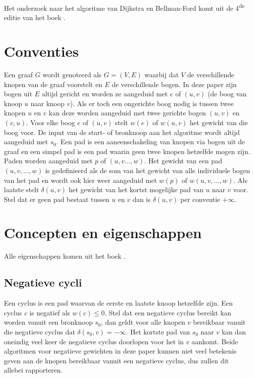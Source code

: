 \documentclass[conference]{IEEEtran}
\theoremstyle{definition}
\DeclarePairedDelimiter{\card}{\vert}{\vert}  %
\begin{document}
Het onderzoek naar het algoritme van Dijkstra en Bellman-Ford komt uit de 4\textsuperscript{de} editie van het boek  \cite{Introduction}.

\section{Conventies}
Een graaf $G$ wordt genoteerd als $G = (V, E)$ waarbij dat $V$ de verschillende knopen van de graaf voorstelt en $E$ de verschillende bogen. In deze paper zijn bogen uit $E$ altijd gericht en worden ze aangeduid met $e$ of $(u, v)$ (de boog van knoop $u$ naar knoop $v$). Als er toch een ongerichte boog nodig is tussen twee knopen $u$ en $v$ kan deze worden aangeduid met twee gerichte bogen $(u, v)$ en $(v, u)$. Voor elke boog $e$ of $(u, v)$ stelt $w(e)$ of $w(u, v)$ het gewicht van die boog voor. De input van de start- of bronknoop aan het algoritme wordt altijd aangeduid met $s_0$. Een pad is een aaneenschakeling van knopen via bogen uit de graaf en een simpel pad is een pad waarin geen twee knopen hetzelfde mogen zijn. Paden worden aangeduid met $p$ of $(u, v \dots, w)$. Het gewicht van een pad $(u, v, \dots, w)$ is gedefinieerd als de som van het gewicht van alle individuele bogen van het pad en wordt ook hier weer aangeduid met $w(p)$ of $w(u, v, \dots, w)$.  Als laatste stelt $\delta(u, v)$ het gewicht van het kortst mogelijke pad van $u$ naar $v$ voor. Stel dat er geen pad bestaat tussen $u$ en $v$ dan is $\delta(u, v)$ per conventie $+ \infty$.

\section{Concepten en eigenschappen}
Alle eigenschappen komen uit het boek  \cite{Introduction}.
\subsection{Negatieve cycli}
Een cyclus is een pad waarvan de eerste en laatste knoop hetzelfde zijn. Een cyclus $c$ is negatief als $w(c) \leq 0$. Stel dat een negatieve cyclus bereikt kan worden vanuit een bronknoop $s_0$, dan geldt voor alle knopen $v$ bereikbaar vanuit die negatieve cyclus dat $\delta(s_0, v) = - \infty$. Het kortste pad van $s_0$ naar $v$ kan dan oneindig veel keer de negatieve cyclus doorlopen voor het in $v$ aankomt. Beide algoritmen voor negatieve gewichten in deze paper kunnen niet veel betekenis geven aan de knopen bereikbaar vanuit een negatieve cyclus, dus zullen dit allebei rapporteren.
\end{document}
